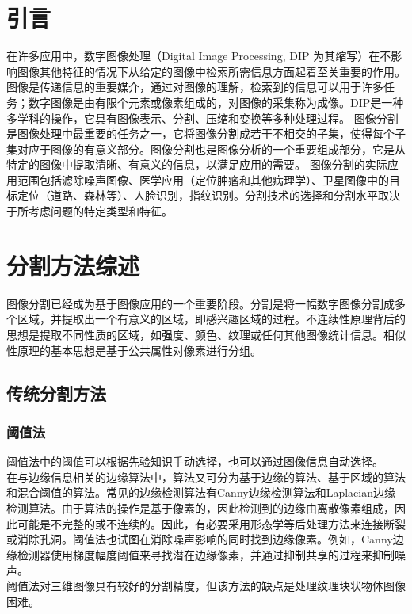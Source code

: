 \documentclass[conference]{IEEEtran}
\begin{document}
\section{引言}
在许多应用中，数字图像处理（Digital Image Processing, DIP 为其缩写）在不影响图像其他特征的情况下从给定的图像中检索所需信息方面起着至关重要的作用。图像是传递信息的重要媒介，通过对图像的理解，检索到的信息可以用于许多任务；数字图像是由有限个元素或像素组成的，对图像的采集称为成像。DIP是一种多学科的操作，它具有图像表示、分割、压缩和变换等多种处理过程。
图像分割是图像处理中最重要的任务之一，它将图像分割成若干不相交的子集，使得每个子集对应于图像的有意义部分。图像分割也是图像分析的一个重要组成部分，它是从特定的图像中提取清晰、有意义的信息，以满足应用的需要。
图像分割的实际应用范围包括滤除噪声图像、医学应用（定位肿瘤和其他病理学）、卫星图像中的目标定位（道路、森林等）、人脸识别，指纹识别。分割技术的选择和分割水平取决于所考虑问题的特定类型和特征。

 

\section{分割方法综述}
	图像分割已经成为基于图像应用的一个重要阶段。分割是将一幅数字图像分割成多个区域，并提取出一个有意义的区域，即感兴趣区域的过程。不连续性原理背后的思想是提取不同性质的区域，如强度、颜色、纹理或任何其他图像统计信息。相似性原理的基本思想是基于公共属性对像素进行分组。

\subsection{传统分割方法}

\subsubsection{阈值法}
阈值法中的阈值可以根据先验知识手动选择，也可以通过图像信息自动选择。\\
在与边缘信息相关的边缘算法中，算法又可分为基于边缘的算法、基于区域的算法和混合阈值的算法。常见的边缘检测算法有Canny边缘检测算法和Laplacian边缘检测算法。由于算法的操作是基于像素的，因此检测到的边缘由离散像素组成，因此可能是不完整的或不连续的。因此，有必要采用形态学等后处理方法来连接断裂或消除孔洞。阈值法也试图在消除噪声影响的同时找到边缘像素。例如，Canny边缘检测器使用梯度幅度阈值来寻找潜在边缘像素，并通过抑制共享的过程来抑制噪声。\\阈值法对三维图像具有较好的分割精度，但该方法的缺点是处理纹理块状物体图像困难。
\end{document}
